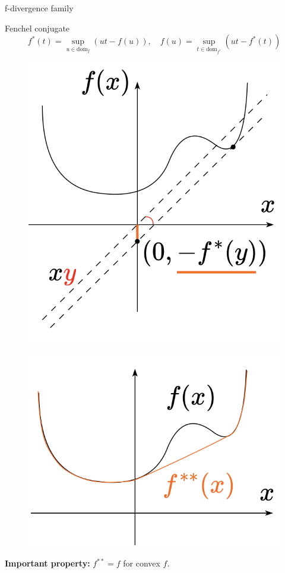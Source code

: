 \documentclass{beamer}
\begin{document}
\begin{frame}{f-divergence family}
	\vspace{-0.3cm}
	\begin{block}{Fenchel conjugate}
		\vspace{-0.5cm}
		\[
		f^*(t) = \sup_{u \in \text{dom}_f} \left( ut - f(u) \right), \quad f(u) = \sup_{t \in \text{dom}_{f^*}} \left( ut - f^*(t) \right)
		\]
		\vspace{-0.3cm}
	\end{block}
	\vspace{-0.3cm}
	\begin{minipage}[t]{0.5\columnwidth}
		\begin{figure}
			\centering
			\includegraphics[width=0.8\linewidth]{figs/conj}
		\end{figure}
	\end{minipage}%
	\begin{minipage}[t]{0.5\columnwidth}
		\begin{figure}
			\centering
			\includegraphics[width=0.85\linewidth]{figs/double_conj}
		\end{figure}
	\end{minipage}
	\textbf{Important property:} $ f^{**} = f$ for convex $f$.
\end{frame}
\end{document}

